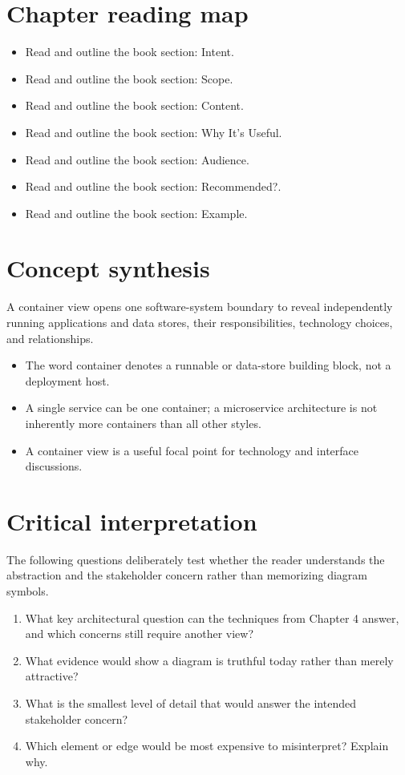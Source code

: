 \documentclass[10pt,letterpaper]{article}
\begin{document}
\section{Chapter reading map}
\begin{itemize}
\item Read and outline the book section: Intent.
\item Read and outline the book section: Scope.
\item Read and outline the book section: Content.
\item Read and outline the book section: Why It’s Useful.
\item Read and outline the book section: Audience.
\item Read and outline the book section: Recommended?.
\item Read and outline the book section: Example.
\end{itemize}

\section{Concept synthesis}
A container view opens one software-system boundary to reveal independently running applications and data stores, their responsibilities, technology choices, and relationships.

\begin{itemize}
\item The word container denotes a runnable or data-store building block, not a deployment host.
\item A single service can be one container; a microservice architecture is not inherently more containers than all other styles.
\item A container view is a useful focal point for technology and interface discussions.
\end{itemize}

\section{Critical interpretation}
The following questions deliberately test whether the reader understands the abstraction and the stakeholder concern rather than memorizing diagram symbols.

\begin{enumerate}
\item What key architectural question can the techniques from Chapter 4 answer, and which concerns still require another view?
\item What evidence would show a diagram is truthful today rather than merely attractive?
\item What is the smallest level of detail that would answer the intended stakeholder concern?
\item Which element or edge would be most expensive to misinterpret? Explain why.
\end{enumerate}
\end{document}
